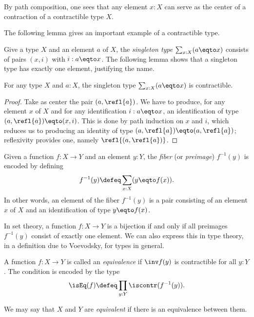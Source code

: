 By path composition, one sees that any element $x : X$ can serve as the center of a contraction of a contractible type $X$.

The following lemma gives an important example of a contractible type.

Give a type $X$ and an element $a$ of $X$,
the \emph{singleton type} $\sum_{x:X} (a \eqto x)$
consists of pairs $(x,i)$ with $i: a \eqto x$. The following lemma shows that a singleton type has exactly one element, justifying the name.

\begin{lemma}\label{lem:thepathspaceiscontractible}
For any type $X$ and $a:X$, the singleton type $\sum_{x:X} (a \eqto x)$ is contractible.
\end{lemma}

\begin{proof}
Take as center the pair $(a,\refl{a})$. We have
to produce, for any element $x$ of $X$ and for any identification
$i: a \eqto x$, an identification of type $(a,\refl{a}) \eqto (x,i)$.  This is done by path induction on $x$ and $i$, which reduces us to producing
an identity of type $(a,\refl{a}) \eqto (a,\refl{a})$; reflexivity provides one, namely $\refl{(a,\refl{a})}$.
\end{proof}

\begin{definition}
\label{def:fiber}
Given a function $f : X \to Y$ and an element $y:Y$,
the \emph{fiber} (or \emph{preimage}) $f^{-1}(y)$
is encoded by defining $$f^{-1}(y) \defeq \sum_{x:X}(y \eqto f(x)).$$
In other words, an element of the fiber $f^{-1}(y)$ is a pair consisting
of an element $x$ of $X$ and an identification of type $y \eqto f(x)$.
\end{definition}

In set theory, a function $f : X \to Y$ is a bijection if and only if
all preimages $f^{-1}(y)$ consist of exactly one element.
We can also express this in type theory, in a definition due
to Voevodsky, for types in general.

\begin{definition}
  \label{def:equivalence}
  A function $f : X \to Y$ is called an \emph{equivalence} if $\inv f(y)$ is contractible for
  all $y:Y$.  The condition is encoded by the type 
\[
\isEq(f) \defeq \prod_{y:Y}\iscontr(f^{-1}(y)).\qedhere
\]
\end{definition}

We may say that $X$ and $Y$ are \emph{equivalent} if there is an equivalence between them.

